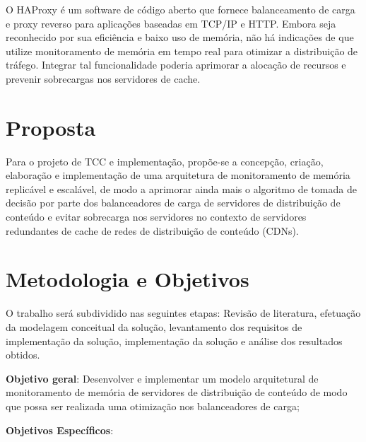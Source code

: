 \documentclass[11pt]{article}
\begin{document}
O HAProxy \cite{haproxy} é um software de código aberto que fornece balanceamento de carga e proxy reverso para aplicações baseadas em TCP/IP e HTTP. Embora seja reconhecido por sua eficiência e baixo uso de memória, não há indicações de que utilize monitoramento de memória em tempo real para otimizar a distribuição de tráfego. Integrar tal funcionalidade poderia aprimorar a alocação de recursos e prevenir sobrecargas nos servidores de cache.

	
\section{Proposta} \label{sec:proposta}

Para o projeto de TCC e implementação, propõe-se a concepção, criação, elaboração e implementação de uma arquitetura de monitoramento de memória replicável e escalável, de modo a aprimorar ainda mais o algoritmo de tomada de decisão por parte dos balanceadores de carga de servidores de distribuição de conteúdo e evitar sobrecarga nos servidores no contexto de servidores redundantes de cache de redes de distribuição de conteúdo (CDNs).

\section{Metodologia e Objetivos} \label{sec:objetivos}

O trabalho será subdividido nas seguintes etapas: Revisão de literatura, efetuação da modelagem conceitual da solução, levantamento dos requisitos de implementação da solução, implementação da solução e análise dos resultados obtidos.

\textbf{Objetivo geral}: Desenvolver e implementar um modelo arquitetural de monitoramento de memória de servidores de distribuição de conteúdo de modo que possa ser realizada uma otimização nos balanceadores de carga;

\vskip 0.5cm

\noindent\textbf{Objetivos Específicos}:
\end{document}
